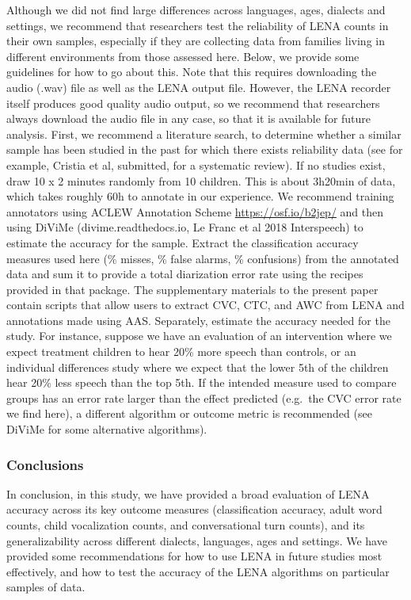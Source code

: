 \documentclass[english,floatsintext,man]{apa6}
\begin{document}
Although we did not find large differences across languages, ages,
dialects and settings, we recommend that researchers test the
reliability of LENA counts in their own samples, especially if they are
collecting data from families living in different environments from
those assessed here. Below, we provide some guidelines for how to go
about this. Note that this requires downloading the audio (.wav) file as
well as the LENA output file. However, the LENA recorder itself produces
good quality audio output, so we recommend that researchers always
download the audio file in any case, so that it is available for future
analysis. First, we recommend a literature search, to determine whether
a similar sample has been studied in the past for which there exists
reliability data (see for example, Cristia et al, submitted, for a
systematic review). If no studies exist, draw 10 x 2 minutes randomly
from 10 children. This is about 3h20min of data, which takes roughly 60h
to annotate in our experience. We recommend training annotators using
ACLEW Annotation Scheme \url{https://osf.io/b2jep/} and then using
DiViMe (divime.readthedocs.io, Le Franc et al 2018 Interspeech) to
estimate the accuracy for the sample. Extract the classification
accuracy measures used here (\% misses, \% false alarms, \% confusions)
from the annotated data and sum it to provide a total diarization error
rate using the recipes provided in that package. The supplementary
materials to the present paper contain scripts that allow users to
extract CVC, CTC, and AWC from LENA and annotations made using AAS.
Separately, estimate the accuracy needed for the study. For instance,
suppose we have an evaluation of an intervention where we expect
treatment children to hear 20\% more speech than controls, or an
individual differences study where we expect that the lower 5th of the
children hear 20\% less speech than the top 5th. If the intended measure
used to compare groups has an error rate larger than the effect
predicted (e.g.~the CVC error rate we find here), a different algorithm
or outcome metric is recommended (see DiViMe for some alternative
algorithms).

\subsubsection{Conclusions}\label{conclusions}

In conclusion, in this study, we have provided a broad evaluation of
LENA accuracy across its key outcome measures (classification accuracy,
adult word counts, child vocalization counts, and conversational turn
counts), and its generalizability across different dialects, languages,
ages and settings. We have provided some recommendations for how to use
LENA in future studies most effectively, and how to test the accuracy of
the LENA algorithms on particular samples of data.
\end{document}
